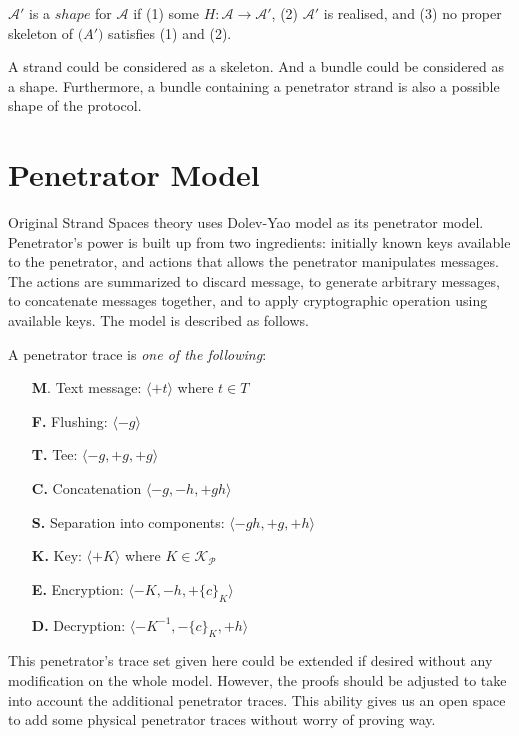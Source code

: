 \begin{Definition}[Shape] $\mathcal{A}'$ is a $shape$ for $\mathcal{A}$ if (1) some $H : \mathcal{A} \rightarrow \mathcal{A'}$, (2) $\mathcal{A'}$ is realised, and (3) no proper skeleton of $\mathcal(A')$ satisfies (1) and (2). 
\end{Definition}

A strand could be considered as a skeleton. And a bundle could be considered as a shape. Furthermore, a bundle containing a penetrator strand is also a possible shape of the protocol. 

\section{Penetrator Model}

Original Strand Spaces theory uses Dolev-Yao \cite{dolev-yao} model as its penetrator model. Penetrator's power is built up from two ingredients: initially known keys available to the penetrator, and actions that allows the penetrator manipulates messages. The actions are summarized to discard message, to generate arbitrary messages, to concatenate messages together, and to apply cryptographic operation using available keys. The model is described as follows. 

\begin{Definition} A penetrator trace is \emph{one of the following}:
\begin{itemize}
\item[\textbf{M}.] Text message: $\langle+t\rangle$ where $t \in T$
\item[\textbf{F.}] Flushing: $\langle-g\rangle$ 
\item[\textbf{T.}] Tee: $\langle-g,+g,+g\rangle$
\item[\textbf{C.}] Concatenation $\langle-g,-h,+gh\rangle$
\item[\textbf{S.}] Separation into components: $\langle-gh,+g,+h\rangle$
\item[\textbf{K.}] Key: $\langle+K\rangle$ where $K \in \mathcal{K_P}$
\item[\textbf{E.}] Encryption: $\langle-K,-h,+\{c\}_K\rangle$
\item[\textbf{D.}] Decryption: $\langle-K^{-1},-\{c\}_K,+h\rangle$
\end{itemize} 
\end{Definition}

This penetrator's trace set given here could be extended if desired without any modification on the whole model. However, the proofs should be adjusted to take into account the additional penetrator traces. This ability gives us an open space to add some physical penetrator traces without worry of proving way. 

